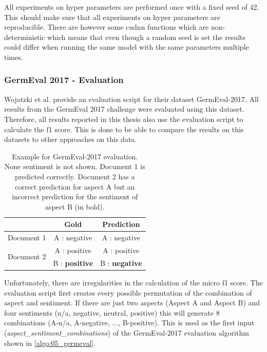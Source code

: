All experiments on hyper parameters are performed once with a fixed seed of 42. This should make sure that all experiments on hyper parameters are reproducible. There are however some cudnn functions which are non-deterministic which means that even though a random seed is set the results could differ when running the same model with the same parameters multiple times.

\subsubsection*{GermEval 2017 - Evaluation}
\label{sec:05_GermEvalEvaluation}
Wojatzki et al. \cite{Wojatzki} provide an evaluation script for their dataset GermEval-2017. All results from the GermEval 2017 challenge were evaluated using this dataset. Therefore, all results reported in this thesis also use the evaluation script to calculate the f1 score. This is done to be able to compare the results on this datasets to other approaches on this data.

\begin{table}
	\centering
	\label{tab:05_germevalEvaluationExample}
	\caption{Example for GermEval-2017 evaluation. None sentiment is not shown. Document 1 is predicted correctly. Document 2 has a correct prediction for aspect A but an incorrect prediction for the sentiment of aspect B {(in bold)}.}
	\begin{tabular}{@{}lcc}
		\toprule 
		& \textbf{Gold} & \textbf{Prediction} \\ 
		\hline 
		Document 1 & A : negative & A : negative \\ 
		\hline 
		\multirow{2}{*}{Document 2} & A : positive & A : positive \\ 
		& B : \textbf{positive} & B : \textbf{negative} \\ 
		\hline 
	\end{tabular}
\end{table}

Unfortunately, there are irregularities in the calculation of the micro f1 score. The evaluation script first creates every possible permutation of the combination of aspect and sentiment. If there are just two aspects {(Aspect A and Aspect B)} and four sentiments {(n/a, negative, neutral, positive)} this will generate 8 combinations {(A-n/a, A-negative, ..., B-positive)}. This is used as the first input {(\textit{aspect\_sentiment\_combinations})} of the GermEval-2017 evaluation algorithm shown in \ref{algo:05_germeval}.
\medskip

